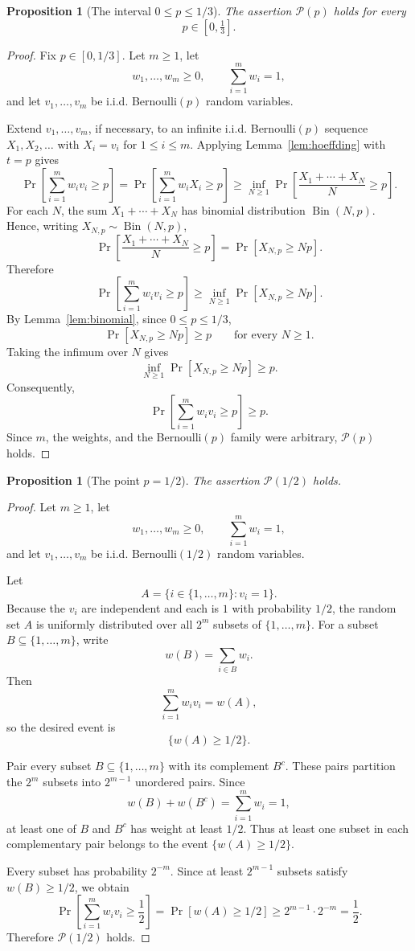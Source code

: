 \documentclass[12pt]{article}
\theoremstyle{definition}
\theoremstyle{plain}
\newtheorem{proposition}[definition]{Proposition}
\theoremstyle{remark}
\begin{document}
\begin{proposition}[The interval \(0\le p\le1/3\)]\label{prop:smallp}
The assertion \(\mathcal P(p)\) holds for every
\[
p\in[0,\tfrac13].
\]
\end{proposition}

\begin{proof}
Fix \(p\in[0,1/3]\). Let \(m\ge1\), let
\[
w_1,\ldots,w_m\ge0,\qquad \sum_{i=1}^{m}w_i=1,
\]
and let \(v_1,\ldots,v_m\) be i.i.d. Bernoulli\((p)\) random variables.

Extend \(v_1,\ldots,v_m\), if necessary, to an infinite i.i.d. Bernoulli\((p)\) sequence \(X_1,X_2,\ldots\) with \(X_i=v_i\) for \(1\le i\le m\). Applying Lemma~\ref{lem:hoeffding} with \(t=p\) gives
\[
\Pr\!\left[\sum_{i=1}^{m}w_i v_i\ge p\right]
=
\Pr\!\left[\sum_{i=1}^{m}w_i X_i\ge p\right]
\ge
\inf_{N\ge1}
\Pr\!\left[\frac{X_1+\cdots+X_N}{N}\ge p\right].
\]
For each \(N\), the sum \(X_1+\cdots+X_N\) has binomial distribution \(\operatorname{Bin}(N,p)\). Hence, writing \(X_{N,p}\sim\operatorname{Bin}(N,p)\),
\[
\Pr\!\left[\frac{X_1+\cdots+X_N}{N}\ge p\right]
=
\Pr[X_{N,p}\ge Np].
\]
Therefore
\[
\Pr\!\left[\sum_{i=1}^{m}w_i v_i\ge p\right]
\ge
\inf_{N\ge1}\Pr[X_{N,p}\ge Np].
\]
By Lemma~\ref{lem:binomial}, since \(0\le p\le1/3\),
\[
\Pr[X_{N,p}\ge Np]\ge p
\qquad\text{for every }N\ge1.
\]
Taking the infimum over \(N\) gives
\[
\inf_{N\ge1}\Pr[X_{N,p}\ge Np]\ge p.
\]
Consequently,
\[
\Pr\!\left[\sum_{i=1}^{m}w_i v_i\ge p\right]\ge p.
\]
Since \(m\), the weights, and the Bernoulli\((p)\) family were arbitrary, \(\mathcal P(p)\) holds.
\end{proof}

\begin{proposition}[The point \(p=1/2\)]\label{prop:halfp}
The assertion \(\mathcal P(1/2)\) holds.
\end{proposition}

\begin{proof}
Let \(m\ge1\), let
\[
w_1,\ldots,w_m\ge0,\qquad \sum_{i=1}^{m}w_i=1,
\]
and let \(v_1,\ldots,v_m\) be i.i.d. Bernoulli\((1/2)\) random variables.

Let
\[
A=\{i\in\{1,\ldots,m\}: v_i=1\}.
\]
Because the \(v_i\) are independent and each is \(1\) with probability \(1/2\), the random set \(A\) is uniformly distributed over all \(2^m\) subsets of \(\{1,\ldots,m\}\). For a subset \(B\subseteq\{1,\ldots,m\}\), write
\[
w(B)=\sum_{i\in B}w_i.
\]
Then
\[
\sum_{i=1}^{m}w_i v_i=w(A),
\]
so the desired event is
\[
\{w(A)\ge1/2\}.
\]

Pair every subset \(B\subseteq\{1,\ldots,m\}\) with its complement \(B^c\). These pairs partition the \(2^m\) subsets into \(2^{m-1}\) unordered pairs. Since
\[
w(B)+w(B^c)=\sum_{i=1}^{m}w_i=1,
\]
at least one of \(B\) and \(B^c\) has weight at least \(1/2\). Thus at least one subset in each complementary pair belongs to the event \(\{w(A)\ge1/2\}\).

Every subset has probability \(2^{-m}\). Since at least \(2^{m-1}\) subsets satisfy \(w(B)\ge1/2\), we obtain
\[
\Pr\!\left[\sum_{i=1}^{m}w_i v_i\ge\frac12\right]
=
\Pr[w(A)\ge1/2]
\ge
2^{m-1}\cdot 2^{-m}
=
\frac12.
\]
Therefore \(\mathcal P(1/2)\) holds.
\end{proof}
\end{document}
